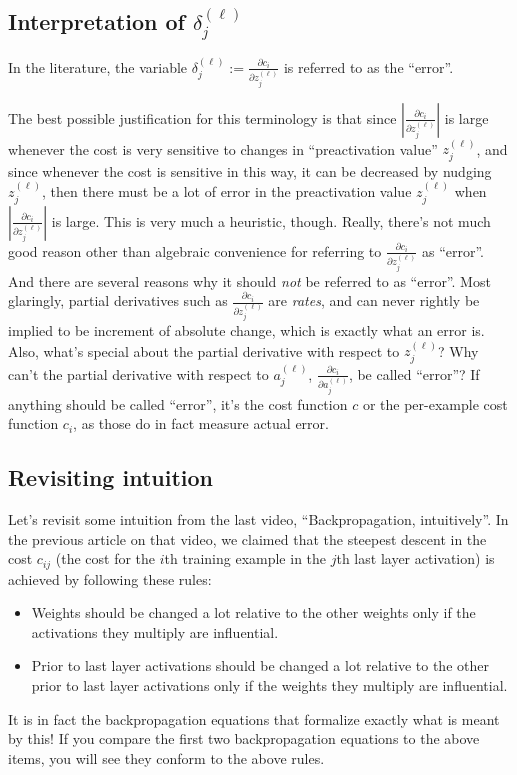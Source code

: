 \documentclass{article}
\begin{document}
	\subsection*{Interpretation of $\delta^{(\ell)}_j$}
	
	In the literature, the variable $\delta^{(\ell)}_j := \frac{\partial c_i}{\partial z^{(\ell)}_j}$ is referred to as the ``error''.
	
	The best possible justification for this terminology is that since $|\frac{\partial c_i}{\partial z^{(\ell)}_j}|$ is large whenever the cost is very sensitive to changes in ``preactivation value'' $z^{(\ell)}_j$, and since whenever the cost is sensitive in this way, it can be decreased by nudging $z^{(\ell)}_j$, then there must be a lot of error in the preactivation value $z^{(\ell)}_j$ when $|\frac{\partial c_i}{\partial z^{(\ell)}_j}|$ is large. This is very much a heuristic, though. Really, there's not much good reason other than algebraic convenience for referring to $\frac{\partial c_i}{\partial z^{(\ell)}_j}$ as ``error''. And there are several reasons why it should \textit{not} be referred to as ``error''. Most glaringly, partial derivatives such as $\frac{\partial c_i}{\partial z^{(\ell)}_j}$ are \textit{rates}, and can never rightly be implied to be increment of absolute change, which is exactly what an error is. Also, what's special about the partial derivative with respect to $z^{(\ell)}_j$? Why can't the partial derivative with respect to $a^{(\ell)}_j$, $\frac{\partial c_i}{\partial a^{(\ell)}_j}$, be called ``error''? If anything should be called ``error'', it's the cost function $c$ or the per-example cost function $c_i$, as those do in fact measure actual error.
	
	\subsection*{Revisiting intuition}
	
	Let's revisit some intuition from the last video, ``Backpropagation, intuitively''. In the previous article on that video, we claimed that the steepest descent in the cost $c_{ij}$ (the cost for the $i$th training example in the $j$th last layer activation) is achieved by following these rules:
	
	\begin{itemize}
		\item Weights should be changed a lot relative to the other weights only if the activations they multiply are influential.
		\item Prior to last layer activations should be changed a lot relative to the other prior to last layer activations only if the weights they multiply are influential.
	\end{itemize}
	
	It is in fact the backpropagation equations that formalize exactly what is meant by this! If you compare the first two backpropagation equations to the above items, you will see they conform to the above rules.
\end{document}

